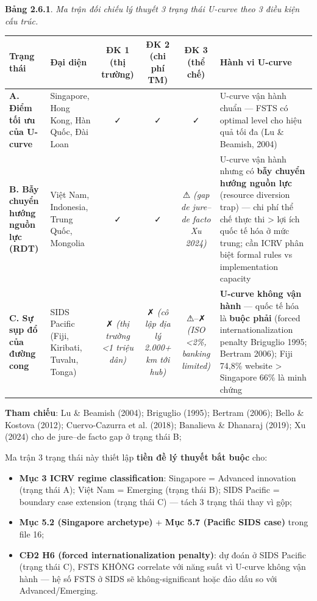 \documentclass[12pt,a4paper]{article}
\providecommand{\tightlist}{\setlength{\itemsep}{0pt}\setlength{\parskip}{0pt}}
\begin{document}
\textbf{Bảng 2.6.1}. \emph{Ma trận đối chiếu lý thuyết 3 trạng thái
U-curve theo 3 điều kiện cấu trúc.}

\begin{longtable}[]{@{}llcccl@{}}
\toprule\noalign{}
Trạng thái & Đại diện & ĐK 1 (thị trường) & ĐK 2 (chi phí TM) & ĐK 3
(thể chế) & Hành vi U-curve \\
\midrule\noalign{}
\endhead
\bottomrule\noalign{}
\endlastfoot
\textbf{A. Điểm tối ưu của U-curve} & Singapore, Hong Kong, Hàn Quốc,
Đài Loan & ✓ & ✓ & ✓ & U-curve vận hành chuẩn --- FSTS có optimal level
cho hiệu quả tối đa (Lu \& Beamish, 2004) \\
\textbf{B. Bẫy chuyển hướng nguồn lực (RDT)} & Việt Nam, Indonesia,
Trung Quốc, Mongolia & ✓ & ✓ & ⚠ \emph{(gap de jure--de facto Xu 2024)}
& U-curve vận hành nhưng có \textbf{bẫy chuyển hướng nguồn lực}
(resource diversion trap) --- chi phí thể chế thực thi \textgreater{}
lợi ích quốc tế hóa ở mức trung; cần ICRV phân biệt formal rules vs
implementation capacity \\
\textbf{C. Sự sụp đổ của đường cong} & SIDS Pacific (Fiji, Kiribati,
Tuvalu, Tonga) & ✗ \emph{(thị trường \textless1 triệu dân)} & ✗
\emph{(cô lập địa lý 2.000+ km tới hub)} & ⚠--✗ \emph{(ISO \textless2\%,
banking limited)} & \textbf{U-curve không vận hành} --- quốc tế hóa là
\textbf{buộc phải} (forced internationalization penalty Briguglio 1995;
Bertram 2006); Fiji 74,8\% website \textgreater{} Singapore 66\% là minh
chứng \\
\end{longtable}

\textbf{Tham chiếu}: Lu \& Beamish (2004); Briguglio (1995); Bertram
(2006); Bello \& Kostova (2012); Cuervo-Cazurra et al. (2018); Banalieva
\& Dhanaraj (2019); Xu (2024) cho de jure--de facto gap ở trạng thái B;

Ma trận 3 trạng thái này thiết lập \textbf{tiền đề lý thuyết bắt buộc}
cho:

\begin{itemize}
\tightlist
\item
  \textbf{Mục 3 ICRV regime classification}: Singapore = Advanced
  innovation (trạng thái A); Việt Nam = Emerging (trạng thái B); SIDS
  Pacific = boundary case extension (trạng thái C) --- tách 3 trạng thái
  thay vì gộp;
\item
  \textbf{Mục 5.2 (Singapore archetype)} + \textbf{Mục 5.7 (Pacific SIDS
  case)} trong file 16;
\item
  \textbf{CĐ2 H6 (forced internationalization penalty)}: dự đoán ở SIDS
  Pacific (trạng thái C), FSTS KHÔNG correlate với năng suất vì U-curve
  không vận hành --- hệ số FSTS ở SIDS sẽ không-significant hoặc đảo dấu
  so với Advanced/Emerging.
\end{itemize}
\end{document}
